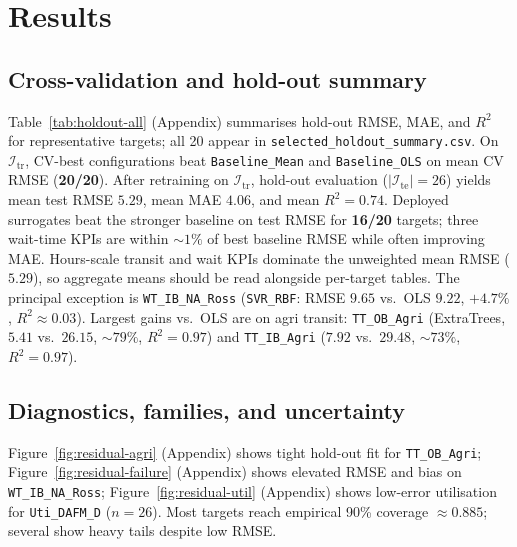 \documentclass[10pt,twocolumn]{article}
\newcommand{\train}{\mathcal{I}_{\mathrm{tr}}}
\newcommand{\test}{\mathcal{I}_{\mathrm{te}}}
\begin{document}
\section{Results}
\label{sec:results}

\subsection{Cross-validation and hold-out summary}
\label{sec:results-summary}

Table~\ref{tab:holdout-all} (Appendix) summarises hold-out RMSE, MAE, and $R^2$ for representative targets; all 20 appear in \texttt{selected\_holdout\_summary.csv}.
On $\train$, CV-best configurations beat \texttt{Baseline\_Mean} and \texttt{Baseline\_OLS} on mean CV RMSE (\textbf{20/20}).
After retraining on $\train$, hold-out evaluation ($|\test|{=}26$) yields mean test RMSE $5.29$, mean MAE $4.06$, and mean $R^2{=}0.74$.
Deployed surrogates beat the stronger baseline on test RMSE for \textbf{16/20} targets; three wait-time KPIs are within ${\sim}1\%$ of best baseline RMSE while often improving MAE.
Hours-scale transit and wait KPIs dominate the unweighted mean RMSE ($5.29$), so aggregate means should be read alongside per-target tables.
The principal exception is \texttt{WT\_IB\_NA\_Ross} (\texttt{SVR\_RBF}: RMSE $9.65$ vs.\ OLS $9.22$, $+4.7\%$, $R^2{\approx}0.03$).
Largest gains vs.\ OLS are on agri transit: \texttt{TT\_OB\_Agri} (ExtraTrees, $5.41$ vs.\ $26.15$, ${\sim}79\%$, $R^2{=}0.97$) and \texttt{TT\_IB\_Agri} ($7.92$ vs.\ $29.48$, ${\sim}73\%$, $R^2{=}0.97$).

\subsection{Diagnostics, families, and uncertainty}
\label{sec:results-diagnostics}

Figure~\ref{fig:residual-agri} (Appendix) shows tight hold-out fit for \texttt{TT\_OB\_Agri}; Figure~\ref{fig:residual-failure} (Appendix) shows elevated RMSE and bias on \texttt{WT\_IB\_NA\_Ross}; Figure~\ref{fig:residual-util} (Appendix) shows low-error utilisation for \texttt{Uti\_DAFM\_D} ($n{=}26$).
Most targets reach empirical 90\% coverage ${\approx}0.885$; several show heavy tails despite low RMSE.
\end{document}
